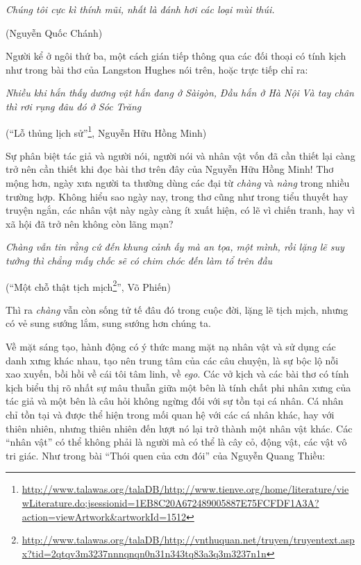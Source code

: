 \documentclass[../main.tex]{subfiles}
\begin{document}
\begin{multicols}{2}
\begin{blockquote}
\textit{Chúng tôi cực kì thính mũi, nhất là đánh hơi các loại mùi thúi.} 
        
(Nguyễn Quốc Chánh) 

\end{blockquote}
 
Người kể ở ngôi thứ ba, một cách gián tiếp thông qua các đối thoại có tính kịch như trong bài thơ của Langston Hughes nói trên, hoặc trực tiếp chỉ ra: 
\begin{blockquote}
        
\textit{Nhiều khi hắn thấy dương vật hắn đang ở Sàigòn,} 
\textit{Đầu hắn ở Hà Nội } 
\textit{Và tay chân thì rơi rụng đâu đó ở Sóc Trăng} 
 
(“Lỗ thủng lịch sử”\footnote{\url{http://www.talawas.org/talaDB/http://www.tienve.org/home/literature/viewLiterature.do;jsessionid=1EB8C20A672489005887E75FCFDF1A3A?action=viewArtwork&artworkId=1512}}, Nguyễn Hữu Hồng Minh) 

\end{blockquote}
 
Sự phân biệt tác giả và người nói, người nói và nhân vật vốn đã cần thiết lại càng trở nên cần thiết khi đọc bài thơ trên đây của Nguyễn Hữu Hồng Minh! Thơ mộng hơn, ngày xưa người ta thường dùng các đại từ \textit{chàng} và\textit{ nàng }trong nhiều trường hợp. Không hiểu sao ngày nay, trong thơ cũng như trong tiểu thuyết hay truyện ngắn, các nhân vật này ngày càng ít xuất hiện, có lẽ vì chiến tranh, hay vì xã hội đã trở nên không còn lãng mạn?  
\begin{blockquote}
 
\textit{Chàng vẫn tin rằng cứ đến khung cảnh ấy mà an tọa, một mình, rồi lặng lẽ suy tưởng thì chẳng mấy chốc sẽ có chim chóc đến làm tổ trên đầu} 
        
(“Một chỗ thật tịch mịch\footnote{\url{http://www.talawas.org/talaDB/http://vnthuquan.net/truyen/truyentext.aspx?tid=2qtqv3m3237nnnqnqn0n31n343tq83a3q3m3237n1n}}”, Võ Phiến) 

\end{blockquote}
 
Thì ra \textit{chàng} vẫn còn sống tử tế đâu đó trong cuộc đời, lặng lẽ tịch mịch, nhưng có vẻ sung sướng lắm, sung sướng hơn chúng ta.  
 
Về mặt sáng tạo, hành động có ý thức mang mặt nạ nhân vật và sử dụng các danh xưng khác nhau, tạo nên trung tâm của các câu chuyện, là sự bộc lộ nỗi xao xuyến, bồi hồi về cái tôi tâm linh, về \textit{ego}. Các vở kịch và các bài thơ có tính kịch biểu thị rõ nhất sự mâu thuẫn giữa một bên là tính chất phi nhân xưng của tác giả và một bên là câu hỏi không ngừng đối với sự tồn tại cá nhân. Cá nhân chỉ tồn tại và được thể hiện trong mối quan hệ với các cá nhân khác, hay với thiên nhiên, nhưng thiên nhiên đến lượt nó lại trở thành một nhân vật khác. Các “nhân vật” có thể không phải là người mà có thể là cây cỏ, động vật, các vật vô tri giác. Như trong bài “Thói quen của cơn đói” của Nguyễn Quang Thiều:        
\begin{blockquote}
        

\end{blockquote}
\end{multicols}
\end{document}
